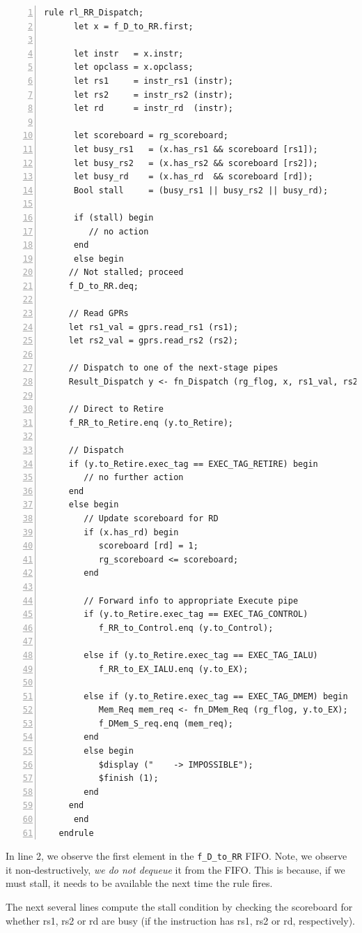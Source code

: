 {\small
\begin{Verbatim}[frame=single, numbers=left, label=(In file:src\_Fife/S3\_RR\_RW.bsv)]
   rule rl_RR_Dispatch;
      let x = f_D_to_RR.first;

      let instr   = x.instr;
      let opclass = x.opclass;
      let rs1     = instr_rs1 (instr);
      let rs2     = instr_rs2 (instr);
      let rd      = instr_rd  (instr);

      let scoreboard = rg_scoreboard;
      let busy_rs1   = (x.has_rs1 && scoreboard [rs1]);
      let busy_rs2   = (x.has_rs2 && scoreboard [rs2]);
      let busy_rd    = (x.has_rd  && scoreboard [rd]);
      Bool stall     = (busy_rs1 || busy_rs2 || busy_rd);

      if (stall) begin
         // no action
      end
      else begin
	 // Not stalled; proceed
	 f_D_to_RR.deq;

	 // Read GPRs
	 let rs1_val = gprs.read_rs1 (rs1);
	 let rs2_val = gprs.read_rs2 (rs2);

	 // Dispatch to one of the next-stage pipes
	 Result_Dispatch y <- fn_Dispatch (rg_flog, x, rs1_val, rs2_val);

	 // Direct to Retire
	 f_RR_to_Retire.enq (y.to_Retire);

	 // Dispatch
	 if (y.to_Retire.exec_tag == EXEC_TAG_RETIRE) begin
	    // no further action
	 end
	 else begin
	    // Update scoreboard for RD
	    if (x.has_rd) begin
	       scoreboard [rd] = 1;
	       rg_scoreboard <= scoreboard;
	    end

	    // Forward info to appropriate Execute pipe
	    if (y.to_Retire.exec_tag == EXEC_TAG_CONTROL)
	       f_RR_to_Control.enq (y.to_Control);

	    else if (y.to_Retire.exec_tag == EXEC_TAG_IALU)
	       f_RR_to_EX_IALU.enq (y.to_EX);

	    else if (y.to_Retire.exec_tag == EXEC_TAG_DMEM) begin
	       Mem_Req mem_req <- fn_DMem_Req (rg_flog, y.to_EX);
	       f_DMem_S_req.enq (mem_req);
	    end
	    else begin
	       $display ("    -> IMPOSSIBLE");
	       $finish (1);
	    end
	 end
      end
   endrule
\end{Verbatim}
}

In line 2, we observe the first element in the \verb|f_D_to_RR| FIFO.
Note, we observe it non-destructively, {\ie} \emph{we do not dequeue}
it from the FIFO.  This is because, if we must stall, it needs to be
available the next time the rule fires.

The next several lines compute the stall condition by checking the
scoreboard for whether rs1, rs2 or rd are busy (if the instruction has
rs1, rs2 or rd, respectively).

